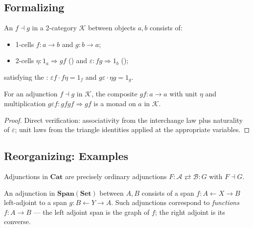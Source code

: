 \subsection{Formalizing}

\begin{definition}
\label{def:adj-2cat}
An  $f \dashv g$ in a 2-category $\mathcal{K}$ between
objects $a, b$ consists of:
\begin{itemize}
  \item 1-cells $f : a \to b$ and $g : b \to a$;
  \item 2-cells $\eta : 1_a \Rightarrow gf$ () and
        $\varepsilon : fg \Rightarrow 1_b$ ();
\end{itemize}
satisfying the :
$\varepsilon f \cdot f\eta = 1_f$ and $g\varepsilon \cdot \eta g = 1_g$.
\end{definition}

\begin{theorem}
\label{thm:adj-gives-monad}
For an adjunction $f \dashv g$ in $\mathcal{K}$, the composite $gf : a \to a$
with unit $\eta$ and multiplication $g \varepsilon f : gfgf \Rightarrow gf$
is a monad on $a$ in $\mathcal{K}$.
\end{theorem}

\begin{proof}
Direct verification: associativity from the interchange law plus naturality
of $\varepsilon$; unit laws from the triangle identities applied at the
appropriate variables.
\end{proof}

\subsection{Reorganizing: Examples}

\begin{example_thm}
Adjunctions in $\mathbf{Cat}$ are precisely ordinary adjunctions
$F : \mathcal{A} \rightleftarrows \mathcal{B} : G$ with $F \dashv G$.
\end{example_thm}

\begin{example_thm}
An adjunction in $\mathbf{Span}(\mathbf{Set})$ between $A, B$ consists of a
span $f : A \leftarrow X \to B$ left-adjoint to a span $g : B \leftarrow Y
\to A$. Such adjunctions correspond to \emph{functions} $f : A \to B$ — the
left adjoint span is the graph of $f$; the right adjoint is its converse.
\end{example_thm}


